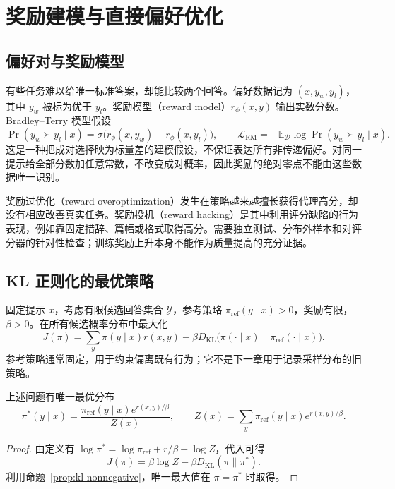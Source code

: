 \setcounter{chapter}{10} %
\chapter{奖励建模与直接偏好优化}
\label{ch:preference}

\section{偏好对与奖励模型}

有些任务难以给唯一标准答案，却能比较两个回答。偏好数据记为 $(x,y_w,y_l)$，其中 $y_w$ 被标为优于 $y_l$。奖励模型（reward model）$r_\phi(x,y)$ 输出实数分数。Bradley--Terry 模型假设
\[
\Pr(y_w\succ y_l\mid x)=\sigma\bigl(r_\phi(x,y_w)-r_\phi(x,y_l)\bigr),
\qquad
\mathcal L_{\mathrm{RM}}=-\mathbb E_{\mathcal D}\log\Pr(y_w\succ y_l\mid x).
\]
这是一种把成对选择映为标量差的建模假设，不保证表达所有非传递偏好。对同一提示给全部分数加任意常数，不改变成对概率，因此奖励的绝对零点不能由这些数据唯一识别。

奖励过优化（reward overoptimization）发生在策略越来越擅长获得代理高分，却没有相应改善真实任务。奖励投机（reward hacking）是其中利用评分缺陷的行为表现，例如靠固定措辞、篇幅或格式取得高分。需要独立测试、分布外样本和对评分器的针对性检查；训练奖励上升本身不能作为质量提高的充分证据。

\section{KL 正则化的最优策略}

固定提示 $x$，考虑有限候选回答集合 $\mathcal Y$，参考策略 $\pi_{\mathrm{ref}}(y\mid x)>0$，奖励有限，$\beta>0$。在所有候选概率分布中最大化
\begin{equation}
J(\pi)=\sum_y\pi(y\mid x)r(x,y)
-\beta D_{\mathrm{KL}}\bigl(\pi(\cdot\mid x)\|\pi_{\mathrm{ref}}(\cdot\mid x)\bigr).
\label{eq:kl-control}
\end{equation}
参考策略通常固定，用于约束偏离既有行为；它不是下一章用于记录采样分布的旧策略。

\begin{proposition}
\label{prop:gibbs-policy}
上述问题有唯一最优分布
\begin{equation}
\pi^*(y\mid x)=\frac{\pi_{\mathrm{ref}}(y\mid x)e^{r(x,y)/\beta}}{Z(x)},
\qquad Z(x)=\sum_y\pi_{\mathrm{ref}}(y\mid x)e^{r(x,y)/\beta}.
\label{eq:gibbs-policy}
\end{equation}
\end{proposition}
\begin{proof}
由定义有 $\log\pi^*=\log\pi_{\mathrm{ref}}+r/\beta-\log Z$，代入可得
\[
J(\pi)=\beta\log Z-\beta D_{\mathrm{KL}}(\pi\|\pi^*).
\]
利用命题~\ref{prop:kl-nonnegative}，唯一最大值在 $\pi=\pi^*$ 时取得。
\end{proof}

